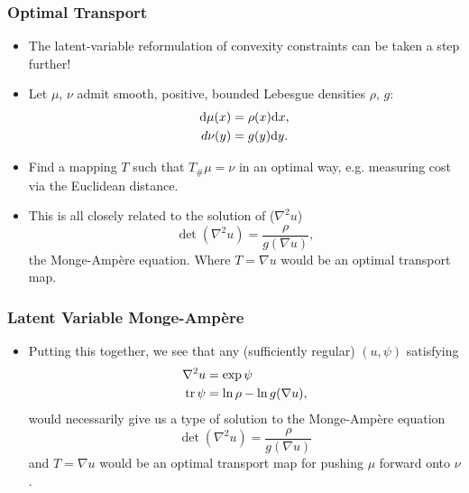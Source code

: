 \documentclass[aspectratio=169,xcolor=dvipsnames,11pt]{beamer}
\begin{document}
\begin{frame}\frametitle{Optimal Transport}
\begin{itemize}
\item The latent-variable reformulation of convexity constraints can be taken a step further!
\item \pause Let $\mu$, $\nu$ admit smooth, positive, bounded Lebesgue densities $\rho$, $g$:
\[
\aligned
\mathrm{d}\mu(x) &= \rho(x) \mathrm{d}x,\\
d\nu(y) &= g(y) \mathrm{d}y.
\endaligned
\]
\item \pause Find a mapping $T$ such that $T_{\#} \mu = \nu$ in an optimal way, e.g. measuring cost via the Euclidean distance.
\item \pause This is all closely related to the solution of ($\nabla^2 u$)
\[
     \operatorname{det}(\nabla^2 u) = \frac{\rho}{g(\nabla u)},
\]
the Monge-Amp\`ere equation. Where $T = \nabla u$ would be an optimal transport map.

\end{itemize}
\end{frame}

\begin{frame}\frametitle{Latent Variable Monge-Amp\`ere}
\begin{itemize}
\item Putting this together, we see that any (sufficiently regular) $(u,\psi)$ satisfying 
\[
\aligned
\nabla^2 u &= \exp \psi\,\\
\mathop{\mathrm{tr}} \psi &= \ln \rho - \ln g(\nabla u),\\
\endaligned
\] \pause
would necessarily give us a type of solution to the Monge-Amp\`ere equation
\[
     \operatorname{det}(\nabla^2 u) = \frac{\rho}{g(\nabla u)}
\]
and $T = \nabla u$ would be an optimal transport map for pushing $\mu$ forward onto $\nu$.
\end{itemize}
\end{frame}
\end{document}
